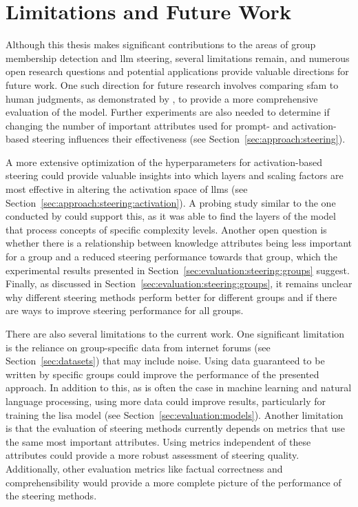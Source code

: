 \section{Limitations and Future Work}
Although this thesis makes significant contributions to the areas of group membership detection and \ac{llm} steering, several limitations remain, and numerous open research questions and potential applications provide valuable directions for future work.
One such direction for future research involves comparing \ac{sfam} to human judgments, as demonstrated by \citet{patelLearningInterpretableStyle2023}, to provide a more comprehensive evaluation of the model. Further experiments are also needed to determine if changing the number of important attributes used for prompt- and activation-based steering influences their effectiveness (see Section~\ref{sec:approach:steering}).

A more extensive optimization of the hyperparameters for activation-based steering could provide valuable insights into which layers and scaling factors are most effective in altering the activation space of \acp{llm} (see Section~\ref{sec:approach:steering:activation}). A probing study similar to the one conducted by \citet{konenStyleVectorsSteering2024} could support this, as it was able to find the layers of the model that process concepts of specific complexity levels. Another open question is whether there is a relationship between knowledge attributes being less important for a group and a reduced steering performance towards that group, which the experimental results presented in Section~\ref{sec:evaluation:steering:groups} suggest. Finally, as discussed in Section~\ref{sec:evaluation:steering:groups}, it remains unclear why different steering methods perform better for different groups and if there are ways to improve steering performance for all groups.

There are also several limitations to the current work. One significant limitation is the reliance on group-specific data from internet forums (see Section~\ref{sec:datasets}) that may include noise. Using data guaranteed to be written by specific groups could improve the performance of the presented approach. In addition to this, as is often the case in machine learning and natural language processing, using more data could improve results, particularly for training the \ac{lisa} model (see Section~\ref{sec:evaluation:models}).
Another limitation is that the evaluation of steering methods currently depends on metrics that use the same most important attributes. Using metrics independent of these attributes could provide a more robust assessment of steering quality. Additionally, other evaluation metrics like factual correctness and comprehensibility would provide a more complete picture of the performance of the steering methods.

